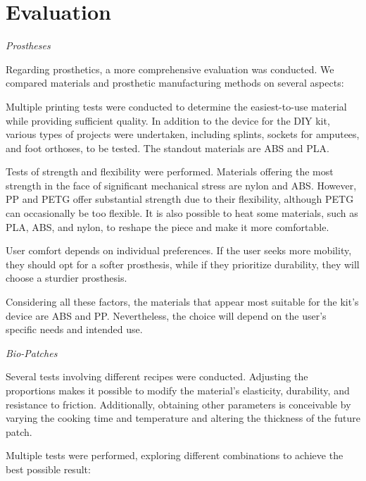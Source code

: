 \section{Evaluation}

\textit{Prostheses}

Regarding prosthetics, a more comprehensive evaluation was conducted. We compared materials and prosthetic manufacturing methods on several aspects:

Multiple printing tests were conducted to determine the easiest-to-use material while providing sufficient quality. In addition to the device for the DIY kit, various types of projects were undertaken, including splints, sockets for amputees, and foot orthoses, to be tested. The standout materials are ABS and PLA. 

Tests of strength and flexibility were performed. Materials offering the most strength in the face of significant mechanical stress are nylon and ABS. However, PP and PETG offer substantial strength due to their flexibility, although PETG can occasionally be too flexible. It is also possible to heat some materials, such as PLA, ABS, and nylon, to reshape the piece and make it more comfortable.

User comfort depends on individual preferences. If the user seeks more mobility, they should opt for a softer prosthesis, while if they prioritize durability, they will choose a sturdier prosthesis.

Considering all these factors, the materials that appear most suitable for the kit's device are ABS and PP. Nevertheless, the choice will depend on the user’s specific needs and intended use. 

\textit{Bio-Patches}

Several tests involving different recipes were conducted. Adjusting the proportions makes it possible to modify the material's elasticity, durability, and resistance to friction. Additionally, obtaining other parameters is conceivable by varying the cooking time and temperature and altering the thickness of the future patch.

Multiple tests were performed, exploring different combinations to achieve the best possible result:

